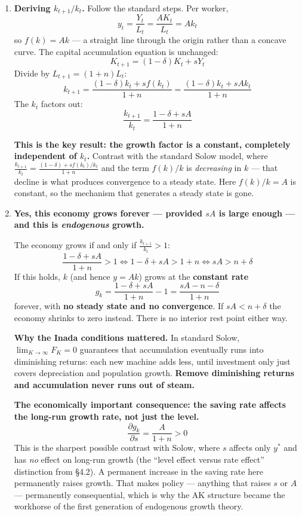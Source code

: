 \documentclass[12pt, letterpaper]{article}
\newcommand{\stst}{^{\ast}}
\begin{document}
\begin{tcolorbox}[evenbox,title={Problem 4.4 \quad An AK Model}]
\begin{enumerate}
\item \textbf{Deriving $k_{t+1}/k_t$.} Follow the standard steps. Per worker,
$$y_t = \frac{Y_t}{L_t} = \frac{AK_t}{L_t} = A k_t$$
so $f(k) = Ak$ --- a straight line through the origin rather than a concave curve. The
capital accumulation equation is unchanged:
$$K_{t+1} = (1-\delta)K_t + sY_t$$
Divide by $L_{t+1} = (1+n)L_t$:
$$k_{t+1} = \frac{(1-\delta)k_t + s f(k_t)}{1+n} = \frac{(1-\delta)k_t + sAk_t}{1+n}$$
The $k_t$ factors out:
$$\boxed{\;\frac{k_{t+1}}{k_t} = \frac{1-\delta+sA}{1+n}\;}$$

\textbf{This is the key result: the growth factor is a constant, completely independent of
$k_t$.} Contrast with the standard Solow model, where $\frac{k_{t+1}}{k_t}
= \frac{(1-\delta) + s f(k_t)/k_t}{1+n}$ and the term $f(k)/k$ is \emph{decreasing} in $k$ ---
that decline is what produces convergence to a steady state. Here $f(k)/k = A$ is constant, so
the mechanism that generates a steady state is gone.

\item \textbf{Yes, this economy grows forever --- provided $sA$ is large enough --- and this
is \emph{endogenous} growth.}

The economy grows if and only if $\frac{k_{t+1}}{k_t} > 1$:
$$\frac{1-\delta+sA}{1+n} > 1 \iff 1-\delta+sA > 1+n
\iff \boxed{sA > n + \delta}$$
If this holds, $k$ (and hence $y = Ak$) grows at the \textbf{constant rate}
$$g_k = \frac{1-\delta+sA}{1+n} - 1 = \frac{sA - n - \delta}{1+n}$$
forever, with \textbf{no steady state and no convergence}. If $sA < n+\delta$ the economy
shrinks to zero instead. There is no interior rest point either way.

\textbf{Why the Inada conditions mattered.} In standard Solow, $\lim_{K\to\infty}F_K = 0$
guarantees that accumulation eventually runs into diminishing returns: each new machine adds
less, until investment only just covers depreciation and population growth. \textbf{Remove
diminishing returns and accumulation never runs out of steam.}

\textbf{The economically important consequence: the saving rate affects the long-run growth
rate, not just the level.}
$$\frac{\partial g_k}{\partial s} = \frac{A}{1+n} > 0$$
This is the sharpest possible contrast with Solow, where $s$ affects only $y\stst$ and has
\emph{no} effect on long-run growth (the ``level effect versus rate effect'' distinction from
\S4.2). A permanent increase in the saving rate here permanently raises growth. That makes
policy --- anything that raises $s$ or $A$ --- permanently consequential, which is why the AK
structure became the workhorse of the first generation of endogenous growth theory.


\end{enumerate}
\end{tcolorbox}
\end{document}
